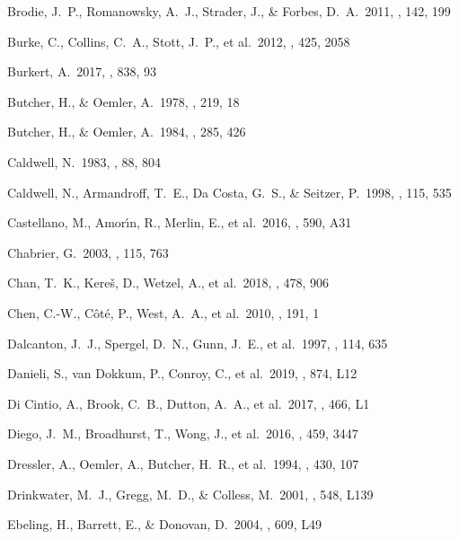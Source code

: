 \documentclass[iop,tighten,twocolumn,apj,floatfix]{emulateapj}
\begin{document}
\begin{thebibliography}{}
 Brodie, J.~P., Romanowsky,
A.~J., Strader, J., \& Forbes, D.~A.\ 2011, \aj, 142, 199 

 Burke, C., Collins, C.~A., Stott, J.~P., et al.\ 2012, \mnras, 425, 2058

 Burkert, A.\ 2017, \apj, 838, 93

 Butcher, H., \& Oemler, A.\ 1978, \apj, 219, 18

 Butcher, H., \& Oemler, A.\ 1984, \apj, 285, 426

 Caldwell, N.\ 1983, \aj, 88, 804

 Caldwell, N., Armandroff, T.~E.,
    Da Costa, G.~S., \& Seitzer, P.\ 1998, \aj, 115, 535

 Castellano, M.,
Amor{\'{\i}}n, R., Merlin, E., et al.\ 2016, \aap, 590, A31 

 Chabrier, G.\ 2003, \pasp, 115,
763

 Chan, T.~K., Kere{\v{s}}, D., Wetzel, A., et al.\ 2018, \mnras, 478, 906

 Chen, C.-W., C{\^o}t{\'e}, P., West, A.~A., et al.\ 2010, \apjs, 191, 1

 Dalcanton, J.~J., Spergel, D.~N., Gunn, J.~E., et al.\ 1997, \aj, 114, 635

 Danieli, S., van Dokkum, P., Conroy, C., et al.\ 2019, \apjl, 874, L12

 Di Cintio, A., Brook,
C.~B., Dutton, A.~A., et al.\ 2017, \mnras, 466, L1

 Diego, J.~M., Broadhurst, T., Wong, J., et al.\ 2016, \mnras, 459, 3447

 Dressler, A., Oemler, A., Butcher, H.~R., et al.\ 1994, \apj, 430, 107

 Drinkwater, M.~J., Gregg,
M.~D., \& Colless, M.\ 2001, \apjl, 548, L139

 Ebeling, H., Barrett, E., \& Donovan, D.\ 2004, \apjl, 609, L49


\end{thebibliography}
\end{document}

